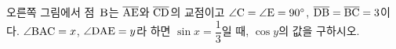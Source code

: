 \noindent\begin{minipage}[t]{0.58\linewidth}\vspace{0pt}\raggedright 오른쪽 그림에서 점~$\mathrm{B}$는 $\overline{\mathrm{AE}}$와 $\overline{\mathrm{CD}}$의 교점이고 $\angle\mathrm{C}=\angle\mathrm{E}=90^\circ$, $\overline{\mathrm{DB}}=\overline{\mathrm{BC}}=3$이다. $\angle\mathrm{BAC}=x$, $\angle\mathrm{DAE}=y$라 하면 $\sin x=\dfrac{1}{3}$일 때, $\cos y$의 값을 구하시오.\end{minipage}\hfill\begin{minipage}[t]{0.4\linewidth}\vspace{0pt}\centering \resizebox{\ifdim\width>\linewidth\linewidth\else\width\fi}{!}{}\end{minipage}\par
